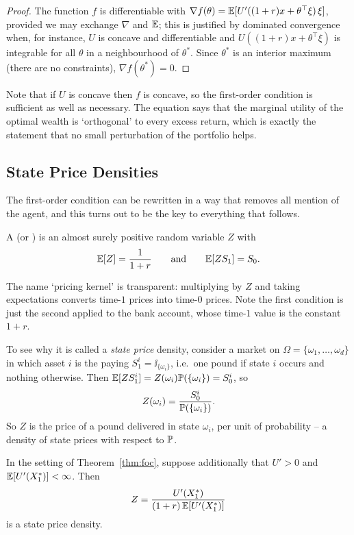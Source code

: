 \documentclass[a4paper]{scrartcl}
\begin{document}
\begin{proof}
	The function $f$ is differentiable with $\nabla f(\theta) = \mathbb{E}[U'((1+r)x + \theta^\top\xi)\,\xi]$, provided we may exchange $\nabla$ and $\mathbb{E}$; this is justified by dominated convergence when, for instance, $U$ is concave and differentiable and $U((1+r)x + \theta^\top \xi)$ is integrable for all $\theta$ in a neighbourhood of $\theta^*$. Since $\theta^*$ is an interior maximum (there are no constraints), $\nabla f(\theta^*) = 0$.
\end{proof}

Note that if $U$ is concave then $f$ is concave, so the first-order condition is sufficient as well as necessary. The equation says that the marginal utility of the optimal wealth is `orthogonal' to every excess return, which is exactly the statement that no small perturbation of the portfolio helps.

\subsection{State Price Densities}

The first-order condition can be rewritten in a way that removes all mention of the agent, and this turns out to be the key to everything that follows.

\begin{definition}
	A  (or ) is an almost surely positive random variable $Z$ with
	$$
	\mathbb{E}[Z] = \frac{1}{1+r} \qquad \text{and} \qquad \mathbb{E}[Z S_1] = S_0.
	$$
\end{definition}

The name `pricing kernel' is transparent: multiplying by $Z$ and taking expectations converts time-$1$ prices into time-$0$ prices. Note the first condition is just the second applied to the bank account, whose time-$1$ value is the constant $1 + r$.

To see why it is called a \emph{state price} density, consider a market on $\Omega = \{\omega_1,\dots,\omega_d\}$ in which asset $i$ is the  paying $S_1^i = \ii_{\{\omega_i\}}$, i.e.\ one pound if state $i$ occurs and nothing otherwise. Then $\mathbb{E}[ZS_1^i] = Z(\omega_i)\mathbb{P}(\{\omega_i\}) = S_0^i$, so
$$
Z(\omega_i) = \frac{S_0^i}{\mathbb{P}(\{\omega_i\})}.
$$
So $Z$ is the price of a pound delivered in state $\omega_i$, per unit of probability -- a density of state prices with respect to $\mathbb{P}$.

\begin{theorem}\label{thm:spd-from-utility}
	In the setting of Theorem~\ref{thm:foc}, suppose additionally that $U' > 0$ and $\mathbb{E}[U'(X_1^*)] < \infty$. Then
	$$
	Z = \frac{U'(X_1^*)}{(1+r)\,\mathbb{E}[U'(X_1^*)]}
	$$
	is a state price density.
\end{theorem}
\end{document}
